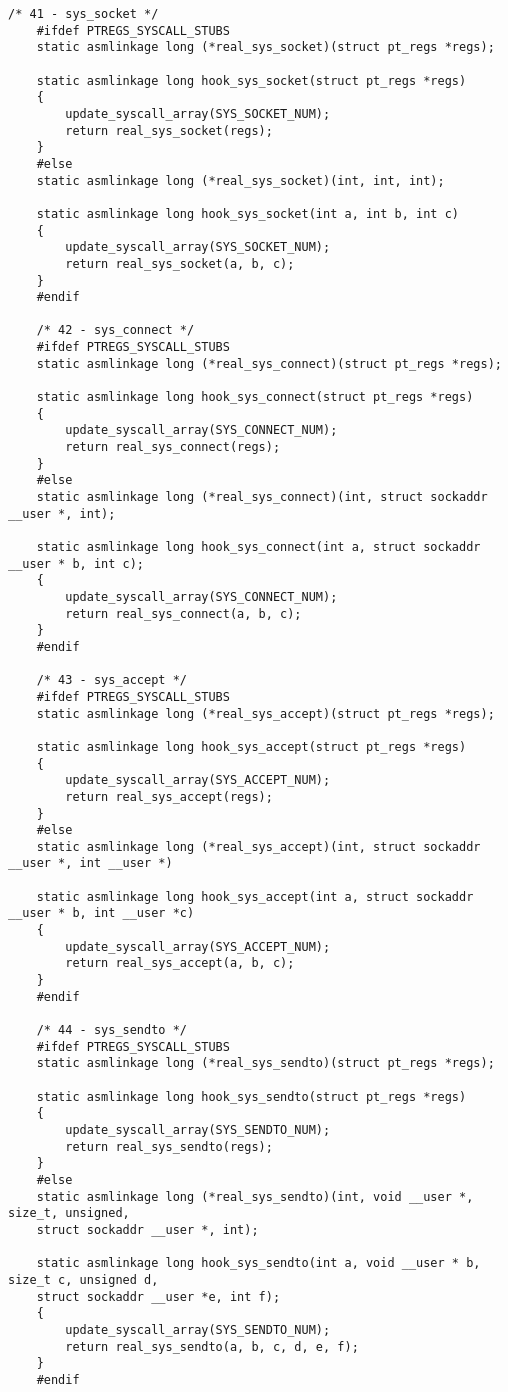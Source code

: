 \begin{lstlisting}[caption={листинг файла hooks.c}]
	/* 41 - sys_socket */
	#ifdef PTREGS_SYSCALL_STUBS
	static asmlinkage long (*real_sys_socket)(struct pt_regs *regs);
	
	static asmlinkage long hook_sys_socket(struct pt_regs *regs)
	{
		update_syscall_array(SYS_SOCKET_NUM);
		return real_sys_socket(regs);
	}
	#else
	static asmlinkage long (*real_sys_socket)(int, int, int);
	
	static asmlinkage long hook_sys_socket(int a, int b, int c)
	{
		update_syscall_array(SYS_SOCKET_NUM);
		return real_sys_socket(a, b, c);
	}
	#endif
	
	/* 42 - sys_connect */
	#ifdef PTREGS_SYSCALL_STUBS
	static asmlinkage long (*real_sys_connect)(struct pt_regs *regs);
	
	static asmlinkage long hook_sys_connect(struct pt_regs *regs)
	{
		update_syscall_array(SYS_CONNECT_NUM);
		return real_sys_connect(regs);
	}
	#else
	static asmlinkage long (*real_sys_connect)(int, struct sockaddr __user *, int);
	
	static asmlinkage long hook_sys_connect(int a, struct sockaddr __user * b, int c);
	{
		update_syscall_array(SYS_CONNECT_NUM);
		return real_sys_connect(a, b, c);
	}
	#endif
	
	/* 43 - sys_accept */
	#ifdef PTREGS_SYSCALL_STUBS
	static asmlinkage long (*real_sys_accept)(struct pt_regs *regs);
	
	static asmlinkage long hook_sys_accept(struct pt_regs *regs)
	{
		update_syscall_array(SYS_ACCEPT_NUM);
		return real_sys_accept(regs);
	}
	#else
	static asmlinkage long (*real_sys_accept)(int, struct sockaddr __user *, int __user *)
	
	static asmlinkage long hook_sys_accept(int a, struct sockaddr __user * b, int __user *c)
	{
		update_syscall_array(SYS_ACCEPT_NUM);
		return real_sys_accept(a, b, c);
	}
	#endif
	
	/* 44 - sys_sendto */
	#ifdef PTREGS_SYSCALL_STUBS
	static asmlinkage long (*real_sys_sendto)(struct pt_regs *regs);
	
	static asmlinkage long hook_sys_sendto(struct pt_regs *regs)
	{
		update_syscall_array(SYS_SENDTO_NUM);
		return real_sys_sendto(regs);
	}
	#else
	static asmlinkage long (*real_sys_sendto)(int, void __user *, size_t, unsigned,
	struct sockaddr __user *, int);
	
	static asmlinkage long hook_sys_sendto(int a, void __user * b, size_t c, unsigned d,
	struct sockaddr __user *e, int f);
	{
		update_syscall_array(SYS_SENDTO_NUM);
		return real_sys_sendto(a, b, c, d, e, f);
	}
	#endif
	

\end{lstlisting}
